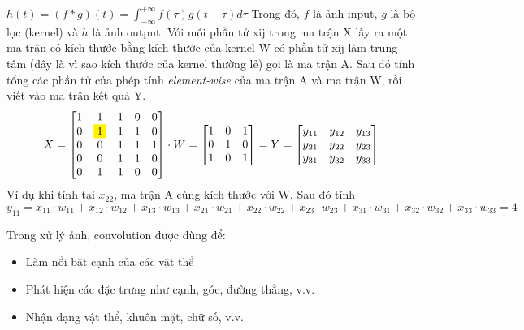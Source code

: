 $h(t) = (f * g)(t) = \int_{-\infty}^{+\infty} f(\tau) g(t - \tau) d\tau$
\newline
Trong đó, $f$ là ảnh input, $g$ là bộ lọc (kernel) và $h$ là ảnh output.
Với mỗi phần tử xij trong ma trận X lấy ra một ma trận có kích thước bằng kích thước của kernel W có phần tử xij làm trung tâm (đây là vì sao kích thước của kernel thường lẻ) gọi là ma trận A. Sau đó tính tổng các phần tử của phép tính \textit{element-wise} của ma trận A và ma trận W, rồi viết vào ma trận kết quả Y.
\begin{equation}
    X=\begin{bmatrix}
        1 & 1 & 1 & 0 & 0 \\
        0 & \colorbox{yellow}{$1$} & 1 & 1 & 0 \\
        0 &  0 & 1 & 1 & 1\\
        0 & 0 & 1 & 1 & 0 \\
        0 & 1 & 1 & 0 & 0
    \end{bmatrix}
    \cdot
    W=\begin{bmatrix}
        1 & 0 & 1 \\
        0 & 1 & 0 \\
        1 & 0 & 1 
       
    \end{bmatrix}
    =
    Y=\begin{bmatrix}
        y_{11} & y_{12}& y_{13} \\
        y_{21} & y_{22}& y_{23} \\
        y_{31} & y_{32}& y_{33}\\
    \end{bmatrix}
\end{equation}
Ví dụ khi tính tại $x_{22}$, ma trận A cùng kích thước với W. Sau đó tính\[
y_{11} = x_{11} \cdot w_{11} + x_{12} \cdot w_{12} + x_{13} \cdot w_{13} + x_{21} \cdot w_{21} + x_{22} \cdot w_{22} + x_{23} \cdot w_{23} + x_{31} \cdot w_{31} + x_{32} \cdot w_{32} + x_{33} \cdot w_{33} = 4
\]

Trong xử lý ảnh, convolution được dùng để:

\begin{itemize}
\item Làm nổi bật cạnh của các vật thể
\item Phát hiện các đặc trưng như cạnh, góc, đường thẳng, v.v.
\item Nhận dạng vật thể, khuôn mặt, chữ số, v.v.
\end{itemize}

